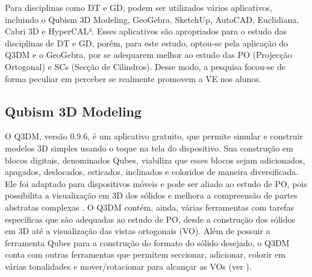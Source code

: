 Para disciplinas como DT e GD, podem ser utilizados vários aplicativos,
incluindo o Qubism 3D Modeling, GeoGebra, SketchUp, AutoCAD, Euclidiana,
Cabri 3D e HyperCAL³. Esses aplicativos são apropriados para o estudo
das disciplinas de DT e GD, porém, para este estudo, optou-se pela
aplicação do Q3DM e o GeoGebra, por se adequarem melhor ao estudo das PO
(Projecção Ortogonal) e SCs (Secção de Cilindros). Desse modo, a
pesquisa focou-se de forma peculiar em perceber se realmente promovem a
VE nos alunos.

\subsection{Qubism 3D Modeling}\label{sub-sec-qubism3dmodeling}

O Q3DM, versão 0.9.6, é um aplicativo gratuito, que permite simular e
construir modelos 3D simples usando o toque na tela do dispositivo. Sua
construção em blocos digitais, denominados Qubes, viabiliza que esses
blocos sejam adicionados, apagados, deslocados, esticados, inclinados e
coloridos de maneira diversificada. Ele foi adaptado para dispositivos
móveis e pode ser aliado ao estudo de PO, pois possibilita a
visualização em 3D dos sólidos e melhora a compreensão de partes
abstratas complexas \cite{chivai2022}. O Q3DM contém, ainda, várias
ferramentas com tarefas específicas que são adequadas ao estudo de PO,
desde a construção dos sólidos em 3D até a visualização das vistas
ortogonais (VO). Além de possuir a ferramenta Qubes para a construção do
formato do sólido desejado, o Q3DM conta com outras ferramentas que
permitem seccionar, adicionar, colorir em várias tonalidades e
mover/rotacionar para alcançar as VOs (ver ).

